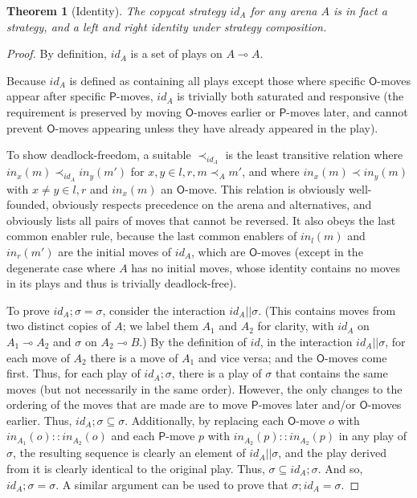 \documentclass{article}
\newtheorem{theorem}{Theorem}
\begin{document}
\begin{theorem}[Identity]
  The copycat strategy $id_A$ for any arena $A$ is in fact a strategy, and a left and right identity under strategy composition.
\end{theorem}
\begin{proof}
  By definition, $id_A$ is a set of plays on $A\multimap A$.

  Because $id_A$ is defined as containing all plays except those where specific $\mathsf{O}$-moves appear after specific $\mathsf{P}$-moves, $id_A$ is trivially both saturated and responsive (the requirement is preserved by moving $\mathsf{O}$-moves earlier or $\mathsf{P}$-moves later, and cannot prevent $\mathsf{O}$-moves appearing unless they have already appeared in the play).

  To show deadlock-freedom, a suitable $\prec_{id_A}$ is the least transitive relation where $in_x(m) \prec_{id_A} in_y(m')$ for $x,y\in{l,r}, m \prec_A m'$, and where $in_x(m) \prec in_y(m)$ with $x\neq y\in{l,r}$ and $in_x(m)$ an $\mathsf{O}$-move. This relation is obviously well-founded, obviously respects precedence on the arena and alternatives, and obviously lists all pairs of moves that cannot be reversed. It also obeys the last common enabler rule, because the last common enablers of $in_l(m)$ and $in_r(m')$ are the initial moves of $id_A$, which are $\mathsf{O}$-moves (except in the degenerate case where $A$ has no initial moves, whose identity contains no moves in its plays and thus is trivially deadlock-free).

  To prove $id_A;\sigma=\sigma$, consider the interaction $id_A||\sigma$. (This contains moves from two distinct copies of $A$; we label them $A_1$ and $A_2$ for clarity, with $id_A$ on $A_1\multimap A_2$ and $\sigma$ on $A_2\multimap B$.) By the definition of $id$, in the interaction $id_A||\sigma$, for each move of $A_2$ there is a move of $A_1$ and vice versa; and the $\mathsf{O}$-moves come first. Thus, for each play of $id_A;\sigma$, there is a play of $\sigma$ that contains the same moves (but not necessarily in the same order). However, the only changes to the ordering of the moves that are made are to move $\mathsf{P}$-moves later and/or $\mathsf{O}$-moves earlier. Thus, $id_A;\sigma\subseteq\sigma$. Additionally, by replacing each $\mathsf{O}$-move $o$ with $in_{A_1}(o)::in_{A_2}(o)$ and each $\mathsf{P}$-move $p$ with $in_{A_2}(p)::in_{A_2}(p)$ in any play of $\sigma$, the resulting sequence is clearly an element of $id_A||\sigma$, and the play derived from it is clearly identical to the original play. Thus, $\sigma\subseteq id_A;\sigma$. And so, $id_A;\sigma=\sigma$. A similar argument can be used to prove that $\sigma;id_A=\sigma$.
\end{proof}
\end{document}
